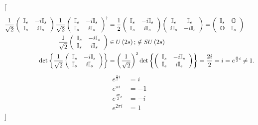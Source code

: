 \documentclass[aps,preprint]{revtex4}%
\begin{document}
$\lceil$%
\begin{align}
\frac{1}{\sqrt{2}}\left(
\begin{array}
[c]{cc}%
\mathbb{I}_{s} & -i\mathbb{I}_{s}\\
\mathbb{I}_{s} & i\mathbb{I}_{s}%
\end{array}
\right)  \frac{1}{\sqrt{2}}\left(
\begin{array}
[c]{cc}%
\mathbb{I}_{s} & -i\mathbb{I}_{s}\\
\mathbb{I}_{s} & i\mathbb{I}_{s}%
\end{array}
\right)  ^{\dagger}  &  =\frac{1}{2}\left(
\begin{array}
[c]{cc}%
\mathbb{I}_{s} & -i\mathbb{I}_{s}\\
\mathbb{I}_{s} & i\mathbb{I}_{s}%
\end{array}
\right)  \left(
\begin{array}
[c]{cc}%
\mathbb{I}_{s} & \mathbb{I}_{s}\\
i\mathbb{I}_{s} & -i\mathbb{I}_{s}%
\end{array}
\right)  =\left(
\begin{array}
[c]{cc}%
\mathbb{I}_{s} & \mathbb{O}\\
\mathbb{O} & \mathbb{I}_{s}%
\end{array}
\right) \\
\frac{1}{\sqrt{2}}\left(
\begin{array}
[c]{cc}%
\mathbb{I}_{s} & -i\mathbb{I}_{s}\\
\mathbb{I}_{s} & i\mathbb{I}_{s}%
\end{array}
\right)   &  \in U\left(  2s\right)  ;\,\notin SU\left(  2s\right) \\
\det\left\{  \frac{1}{\sqrt{2}}\left(
\begin{array}
[c]{cc}%
\mathbb{I}_{s} & -i\mathbb{I}_{s}\\
\mathbb{I}_{s} & i\mathbb{I}_{s}%
\end{array}
\right)  \right\}   &  =\left(  \frac{1}{\sqrt{2}}\right)  ^{2}\det\left\{
\left(
\begin{array}
[c]{cc}%
\mathbb{I}_{s} & -i\mathbb{I}_{s}\\
\mathbb{I}_{s} & i\mathbb{I}_{s}%
\end{array}
\right)  \right\}  =\frac{2i}{2}=i=e^{\frac{\pi}{2}i}\neq1.
\end{align}%
\begin{align}
e^{\frac{\pi}{2}i}  &  =i\\
e^{\pi i}  &  =-1\\
e^{\frac{3\pi}{2}i}  &  =-i\\
e^{2\pi i}  &  =1
\end{align}
$\rfloor$
\end{document}
